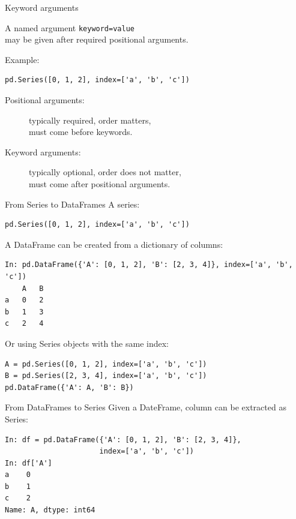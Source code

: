 \documentclass[aspectratio=169,usenames,dvipsnames]{beamer}
\begin{document}
\begin{frame}[fragile]{Keyword arguments}
    \begin{definition}
        A named  argument \texttt{keyword=value} \\
        may be given after required positional arguments.
    \end{definition}

Example:
\begin{lstlisting}
pd.Series([0, 1, 2], index=['a', 'b', 'c'])
\end{lstlisting}
\pause

    \begin{description}
        \item[Positional arguments:]
            typically required, order matters, \\
            must come before keywords.
        \item[Keyword arguments:]
            typically optional, order does not matter,\\
            must come after positional arguments.
    \end{description}
\end{frame}

\begin{frame}[fragile]{From Series to DataFrames}
A series:
\begin{lstlisting}
pd.Series([0, 1, 2], index=['a', 'b', 'c'])
\end{lstlisting}

\pause
A DataFrame can be created from a dictionary of columns:
\begin{lstlisting}
In: pd.DataFrame({'A': [0, 1, 2], 'B': [2, 3, 4]}, index=['a', 'b', 'c'])
    A   B
a   0   2
b   1   3
c   2   4
\end{lstlisting}

\pause
Or using Series objects with the same index:
\begin{lstlisting}
A = pd.Series([0, 1, 2], index=['a', 'b', 'c'])
B = pd.Series([2, 3, 4], index=['a', 'b', 'c'])
pd.DataFrame({'A': A, 'B': B})
\end{lstlisting}
\end{frame}


\begin{frame}[fragile]{From DataFrames to Series}
Given a DateFrame, column can be extracted as Series:
\begin{lstlisting}
In: df = pd.DataFrame({'A': [0, 1, 2], 'B': [2, 3, 4]},
                      index=['a', 'b', 'c'])
In: df['A']
a    0
b    1
c    2
Name: A, dtype: int64
\end{lstlisting}
\end{frame}
\end{document}
